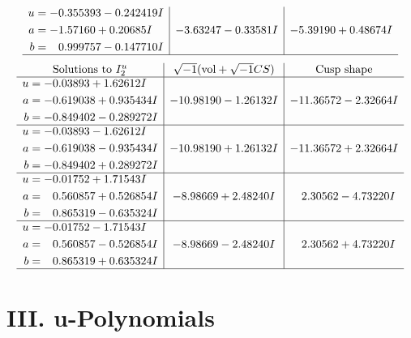 \documentclass[1p]{elsarticle_modified}
\theoremstyle{definition}
\newcommand{\I}{\sqrt{-1}}
\begin{document}
$$\begin{array}{c|c|c}
\begin{aligned}
u &= -0.355393 - 0.242419 I \\
a &= -1.57160 + 0.20685 I \\
b &= \phantom{-}0.999757 - 0.147710 I\end{aligned}
 & -3.63247 - 0.33581 I & -5.39190 + 0.48674 I\\
 \hline 
 \end{array}$$\newpage$$\begin{array}{c|c|c}  
\text{Solutions to }I^u_{2}& \I (\text{vol} + \sqrt{-1}CS) & \text{Cusp shape}\\
 \hline 
\begin{aligned}
u &= -0.03893 + 1.62612 I \\
a &= -0.619038 + 0.935434 I \\
b &= -0.849402 - 0.289272 I\end{aligned}
 & -10.98190 - 1.26132 I & -11.36572 - 2.32664 I \\ \hline\begin{aligned}
u &= -0.03893 - 1.62612 I \\
a &= -0.619038 - 0.935434 I \\
b &= -0.849402 + 0.289272 I\end{aligned}
 & -10.98190 + 1.26132 I & -11.36572 + 2.32664 I \\ \hline\begin{aligned}
u &= -0.01752 + 1.71543 I \\
a &= \phantom{-}0.560857 + 0.526854 I \\
b &= \phantom{-}0.865319 - 0.635324 I\end{aligned}
 & -8.98669 + 2.48240 I & \phantom{-}2.30562 - 4.73220 I \\ \hline\begin{aligned}
u &= -0.01752 - 1.71543 I \\
a &= \phantom{-}0.560857 - 0.526854 I \\
b &= \phantom{-}0.865319 + 0.635324 I\end{aligned}
 & -8.98669 - 2.48240 I & \phantom{-}2.30562 + 4.73220 I\\
 \hline 
 \end{array}$$\newpage
\newpage\renewcommand{\arraystretch}{1}
\centering \section*{ III. u-Polynomials}
\end{document}
